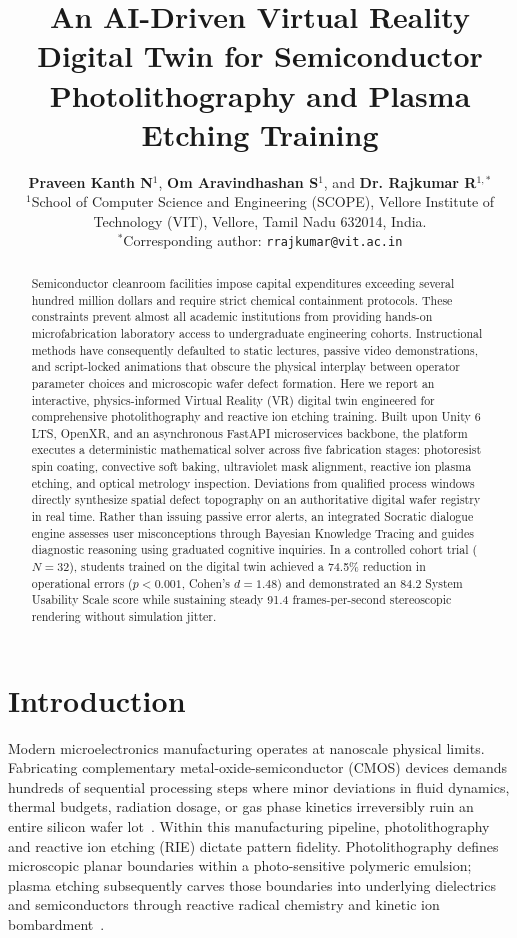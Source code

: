 \documentclass[10pt,a4paper,twocolumn]{article}
\title{\textbf{\LARGE An AI-Driven Virtual Reality Digital Twin for Semiconductor Photolithography and Plasma Etching Training}}
\author{
    \textbf{Praveen Kanth N}$^{1}$, 
    \textbf{Om Aravindhashan S}$^{1}$, and 
    \textbf{Dr. Rajkumar R}$^{1,*}$\\[0.8em]
    \small $^{1}$School of Computer Science and Engineering (SCOPE), Vellore Institute of Technology (VIT), Vellore, Tamil Nadu 632014, India.\\
    \small $^{*}$Corresponding author: \texttt{rrajkumar@vit.ac.in}
}
\date{}
\begin{document}
\maketitle

\begin{abstract}
Semiconductor cleanroom facilities impose capital expenditures exceeding several hundred million dollars and require strict chemical containment protocols. These constraints prevent almost all academic institutions from providing hands-on microfabrication laboratory access to undergraduate engineering cohorts. Instructional methods have consequently defaulted to static lectures, passive video demonstrations, and script-locked animations that obscure the physical interplay between operator parameter choices and microscopic wafer defect formation. Here we report an interactive, physics-informed Virtual Reality (VR) digital twin engineered for comprehensive photolithography and reactive ion etching training. Built upon Unity 6 LTS, OpenXR, and an asynchronous FastAPI microservices backbone, the platform executes a deterministic mathematical solver across five fabrication stages: photoresist spin coating, convective soft baking, ultraviolet mask alignment, reactive ion plasma etching, and optical metrology inspection. Deviations from qualified process windows directly synthesize spatial defect topography on an authoritative digital wafer registry in real time. Rather than issuing passive error alerts, an integrated Socratic dialogue engine assesses user misconceptions through Bayesian Knowledge Tracing and guides diagnostic reasoning using graduated cognitive inquiries. In a controlled cohort trial ($N=32$), students trained on the digital twin achieved a 74.5\% reduction in operational errors ($p < 0.001$, Cohen's $d = 1.48$) and demonstrated an 84.2 System Usability Scale score while sustaining steady 91.4 frames-per-second stereoscopic rendering without simulation jitter.
\end{abstract}

\vspace{0.8em}

\section*{Introduction}
Modern microelectronics manufacturing operates at nanoscale physical limits. Fabricating complementary metal-oxide-semiconductor (CMOS) devices demands hundreds of sequential processing steps where minor deviations in fluid dynamics, thermal budgets, radiation dosage, or gas phase kinetics irreversibly ruin an entire silicon wafer lot~\cite{chen2023review}. Within this manufacturing pipeline, photolithography and reactive ion etching (RIE) dictate pattern fidelity. Photolithography defines microscopic planar boundaries within a photo-sensitive polymeric emulsion; plasma etching subsequently carves those boundaries into underlying dielectrics and semiconductors through reactive radical chemistry and kinetic ion bombardment~\cite{lieberman2005principles}. 
\end{document}
